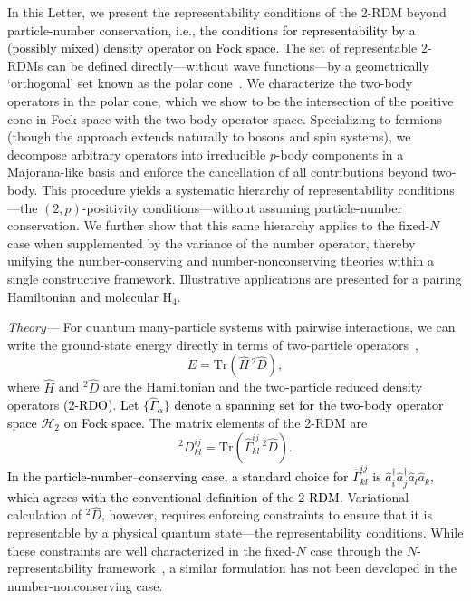 \documentclass[aps,prl,floatfix,twocolumn,showpacs,10pt]{revtex4-2}
\begin{document}
In this Letter, we present the representability conditions of the 2-RDM beyond particle-number conservation\textcolor{black}{, i.e., the conditions for representability by a (possibly mixed) density operator on Fock space.}  The set of representable 2-RDMs can be defined directly---without wave functions---by a geometrically `orthogonal' set known as the polar cone~\cite{Coleman2000, Kummer1967, Erdahl1978, Mazziotti2012b}. We characterize the two-body operators in the polar cone, which we show to be the intersection of the positive cone in Fock space with the two-body operator space. Specializing to fermions (though the approach extends naturally to bosons and spin systems), we decompose arbitrary operators into irreducible $p$-body components in a Majorana-like basis and enforce the cancellation of all contributions beyond two-body. This procedure yields a systematic hierarchy of representability conditions---the $(2,p)$-positivity conditions---without assuming particle-number conservation. We further show that this same hierarchy applies to the fixed-$N$ case when supplemented by the variance of the number operator, thereby unifying the number-conserving and number-nonconserving theories within a single constructive framework. Illustrative applications are presented for a pairing Hamiltonian and molecular H$_{4}$.

{\em Theory---} For quantum many-particle systems with pairwise interactions, we can write the ground-state energy directly in terms of two-particle operators~\cite{Mazziotti2007, Coleman2000},
\begin{equation}
E = \mathrm{Tr}\!\left(\hat H\, {}^{2}\!\hat D\right),
\end{equation}
where $\hat H$ and ${}^{2}\!\hat D$ are the Hamiltonian and the two-particle reduced density operators \textcolor{black}{(2-RDO)}.  \textcolor{black}{Let $\{\hat\Gamma_\alpha\}$ denote a spanning set for the two-body operator space $\mathcal H_2$ on Fock space.}  The matrix elements of the 2-RDM are
\begin{equation}
{}^{2}D^{ij}_{kl} = \mathrm{Tr}\!\left(\hat\Gamma^{ij}_{kl}\, {}^{2}\!\hat D\right).
\label{eq:rdm2}
\end{equation}
\textcolor{black}{In the particle-number–conserving case, a standard choice for $\hat\Gamma^{ij}_{kl}$ is ${\hat a}^{\dagger}_{i} {\hat a}^{\dagger}_{j} {\hat a}_{l} {\hat a}_{k}$, which agrees with the conventional definition of the 2-RDM.}  Variational calculation of ${}^{2}\!\hat D$, however, requires enforcing constraints to ensure that it is representable by a physical quantum state---the representability conditions.  While these constraints are well characterized in the fixed-$N$ case through the $N$-representability framework~\cite{Mazziotti2012b, Mazziotti.2023}, a similar formulation has not been developed in the number-nonconserving case.
\end{document}
